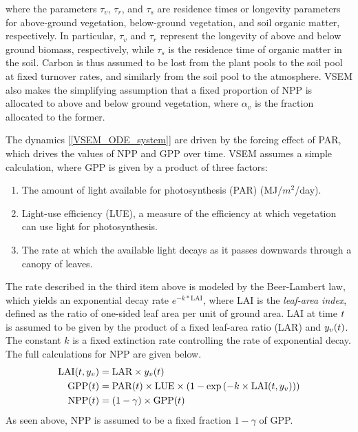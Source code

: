 \documentclass[12pt]{article}
\begin{document}
where the parameters $\tau_v$, $\tau_r$, and $\tau_s$ are residence times or longevity parameters for above-ground vegetation, below-ground vegetation, and soil organic matter, 
respectively. In particular, $\tau_v$ and $\tau_r$ represent the longevity of above and below ground biomass, respectively, while $\tau_s$ is the residence time of organic matter 
in the soil. Carbon is thus assumed to be lost from the plant pools to the soil pool at fixed turnover rates, and similarly from the soil pool to the atmosphere. VSEM also makes the simplifying assumption that a fixed proportion of NPP is allocated to above and below ground vegetation, where $\alpha_v$ is the fraction
allocated to the former. 

The dynamics [\ref{VSEM_ODE_system}] are driven by the forcing effect of PAR, which drives the values of NPP and GPP over time. VSEM assumes a simple calculation, 
where GPP is given by a product of three factors:
\begin{enumerate}
\item The amount of light available for photosynthesis (PAR) (MJ/$m^2$/day).
\item Light-use efficiency (LUE), a measure of the efficiency at which vegetation can use light for photosynthesis. 
\item The rate at which the available light decays as it passes downwards through a canopy of leaves. 
\end{enumerate}
The rate described in the third item above is modeled by the Beer-Lambert law, which yields an exponential decay rate $e^{-k*\text{LAI}}$, 
where LAI is the \textit{leaf-area index}, defined as the ratio of one-sided leaf area per unit of ground area. LAI at time $t$ is assumed to be given by the product of a fixed 
leaf-area ratio (LAR) and $y_v(t)$. The constant $k$ is a fixed extinction rate controlling the rate of exponential decay. The full calculations for NPP are given below. 
\begin{align}
\text{LAI}(t, y_v) &= \text{LAR} \times y_v(t) \\
\text{GPP}(t) &= \text{PAR}(t) \times \text{LUE} \times \left(1 -  \exp\left(-k \times \text{LAI}(t, y_v) \right) \right) \nonumber \\
\text{NPP}(t) &= (1 - \gamma) \times \text{GPP}(t) \nonumber
\end{align}
As seen above, NPP is assumed to be a fixed fraction $1 - \gamma$ of GPP.
\end{document}
